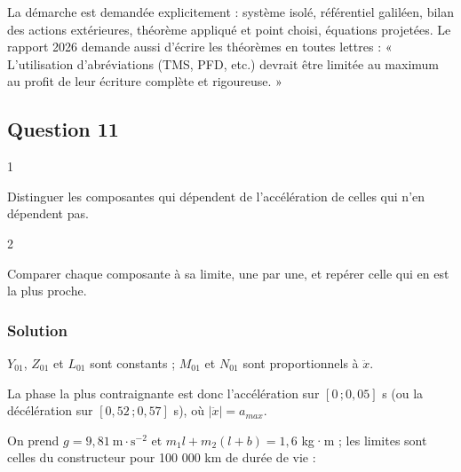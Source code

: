 \documentclass[11pt,a4paper]{article}
\begin{document}
\begin{jury}

La démarche est demandée explicitement : système isolé, référentiel galiléen, bilan des actions extérieures, théorème appliqué et point choisi, équations projetées. Le rapport 2026 demande aussi d'écrire les théorèmes en toutes lettres : « L'utilisation d'abréviations (TMS, PFD, etc.) devrait être limitée au maximum au profit de leur écriture complète et rigoureuse. »

\end{jury}

\hypertarget{question-11}{%
\subsection{Question 11}\label{question-11}}

\begin{indication}{1}

Distinguer les composantes qui dépendent de l'accélération de celles qui n'en dépendent pas.

\end{indication}

\begin{indication}{2}

Comparer chaque composante à sa limite, une par une, et repérer celle qui en est la plus proche.

\end{indication}

\hypertarget{solution-10}{%
\subsubsection{Solution}\label{solution-10}}

\(Y_{01}\), \(Z_{01}\) et \(L_{01}\) sont constants ; \(M_{01}\) et \(N_{01}\) sont proportionnels à \(\ddot x\).

La phase la plus contraignante est donc l'accélération sur \([0\,;0{,}05]\) s (ou la décélération sur \([0{,}52\,;0{,}57]\) s), où \(|\ddot x|=a_{max}\).

On prend \(g=9{,}81\ \mathrm{m\cdot s^{-2}}\) et \(m_1l+m_2(l+b)=1{,}6\) kg·m ; les limites sont celles du constructeur pour 100 000 km de durée de vie :
\end{document}
